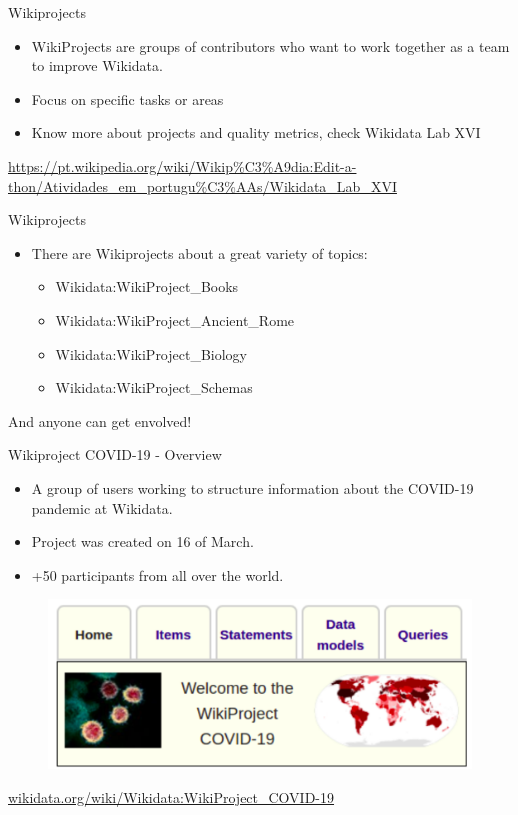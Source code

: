 \documentclass{beamer}
\begin{document}
\begin{frame}{Wikiprojects}

\begin{itemize}
    \item WikiProjects are groups of contributors who want to work together as a team to improve Wikidata.
    \item Focus on specific tasks or areas
    \item Know more about projects and quality metrics, check Wikidata Lab XVI 
    
\end{itemize}
\vskip 3cm
\url{https://pt.wikipedia.org/wiki/Wikip\%C3\%A9dia:Edit-a-thon/Atividades_em_portugu\%C3\%AAs/Wikidata_Lab_XVI}

\end{frame}


\begin{frame}{Wikiprojects}

\begin{itemize}
    \item There are Wikiprojects about a great variety of topics:
    \begin{itemize}
        \item Wikidata:WikiProject\_Books
        \item Wikidata:WikiProject\_Ancient\_Rome
        \item Wikidata:WikiProject\_Biology
        \item Wikidata:WikiProject\_Schemas
    \end{itemize}
\vskip 1cm
\end{itemize}
And anyone can get envolved!

\end{frame}

\begin{frame}{Wikiproject COVID-19 - Overview}

\begin{itemize}
    \item A group of users working to structure information about the COVID-19 pandemic at Wikidata.
    \item Project was created on 16 of March.
    \item +50 participants from all over the world.
\end{itemize}

\begin{figure}
\includegraphics[scale=0.65]{fig/covid_banner.png}
\end{figure}
\vskip 2cm

\url{wikidata.org/wiki/Wikidata:WikiProject_COVID-19}

\end{frame}
\end{document}
